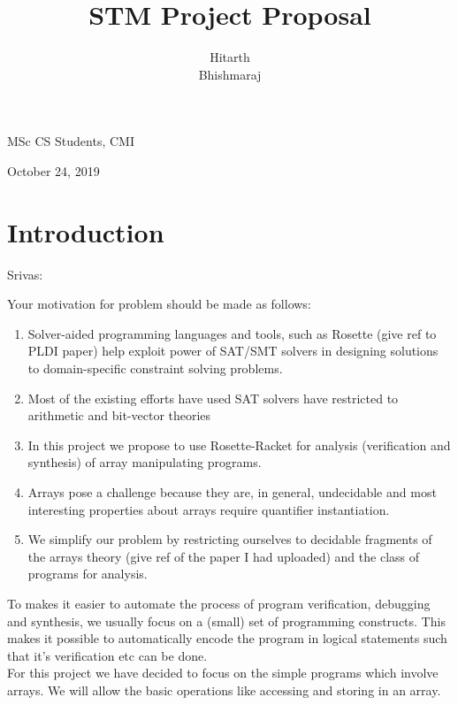 \documentclass[a4paper, 12pt, notitlepage] {article}
\author{Hitarth \\ Bhishmaraj}
\title{STM Project Proposal}
\date{} %
\newcommand{\mscmt}[1]{{\color{blue} \tiny{Srivas: {#1}}}}
\begin{document}
\maketitle		


\begin{center}
MSc CS Students, CMI
\end{center}
\begin{center}
October 24, 2019
\end{center}
\newpage

\section{Introduction}

\mscmt{Your motivation for problem should be made as follows:
\begin{enumerate}
\item Solver-aided programming languages and tools, such as Rosette (give ref to PLDI paper) help exploit power of SAT/SMT solvers in designing solutions to domain-specific constraint solving problems.

\item Most of the existing efforts have used SAT solvers have restricted to arithmetic and bit-vector theories

\item In this project we propose to use Rosette-Racket for analysis (verification and synthesis) of  array manipulating programs.

\item Arrays pose a challenge because they are, in general, undecidable and most interesting properties about arrays require quantifier instantiation.

\item We simplify our problem by restricting ourselves to decidable fragments of the arrays theory (give ref of the paper I had uploaded) and the class of programs for analysis.
\end{enumerate}
}

To makes it easier to automate the process of program verification, debugging and synthesis, we usually focus on a (small) set of programming constructs. This makes it possible to automatically encode the program in logical statements such that it's verification etc can be done. \\

For this project we have decided to focus on the simple programs which involve arrays. We will allow the basic operations like accessing and storing in an array.
\end{document}
